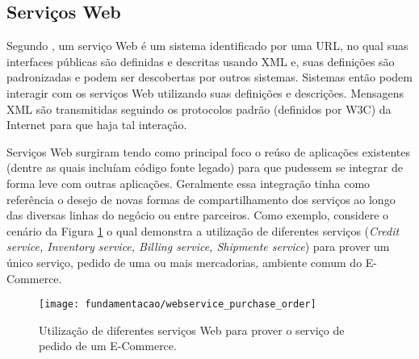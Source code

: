 \subsection{Serviços Web}
\label{ws:webservices}
Segundo \cite{Dustdar:2005}, um serviço Web é um sistema identificado por uma URL\footnotemark {}, no qual suas interfaces públicas são definidas e descritas usando XML\footnotemark {} e, suas definições são padronizadas e podem ser descobertas por outros sistemas. Sistemas então podem interagir com os serviços Web utilizando suas definições e descrições. Mensagens XML são transmitidas seguindo os protocolos padrão (definidos por W3C\footnotemark {}) da Internet para que haja tal interação.

Serviços Web surgiram tendo como principal foco o reúso de aplicações existentes (dentre as quais incluíam código fonte legado) para que pudessem se integrar de forma leve com outras aplicações. Geralmente essa integração tinha como referência o desejo de  novas formas de compartilhamento dos serviços ao longo das diversas linhas do negócio ou entre parceiros. Como exemplo, considere o cenário da Figura \ref{fig:ws_purchase_order} o qual demonstra a utilização de diferentes serviços (\textit{Credit service, Inventory service, Billing service, Shipmente service}) para prover um único serviço, pedido de uma ou mais mercadorias, ambiente comum do E-Commerce.

\begin{figure}[!htb] \centering 
  \centering
  \texttt{[image: fundamentacao/webservice\_purchase\_order]} 
  \caption{Utilização de diferentes serviços Web para prover o serviço de pedido de um E-Commerce. \cite{Papazoglou:2008}} 
  \label{fig:ws_purchase_order}
\end{figure}


